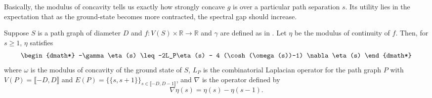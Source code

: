 Basically, the modulus of concavity tells us exactly how strongly concave $g$ is over a particular path separation $s$. Its utility lies in the expectation that as the ground-state becomes more contracted, the spectral gap should increase.

\begin{lem}\label{prop:pathop}
	Suppose $S$ is a path graph of diameter $D$ and $f:V(S)\times \mathbb{R} \longrightarrow \mathbb{R}$ and $\gamma$ are defined as in . Let $\eta$ be the modulus of continuity of $f$. Then, for $s \geq 1$, $\eta$ satisfies
	 \begin{dgroup*}
	 	\begin{dmath*}
	 	-\gamma \eta(s) \leq -2L_P\eta(s) - 4 (\cosh(\omega(s))-1) \nabla \eta(s) 
	 	\end{dmath*}
	 \end{dgroup*}
	 where $\omega$ is the modulus of concavity of the ground state of $S$, $L_P$ is the combinatorial Laplacian operator for the path graph $P$ with $V(P)=\llbracket -D,D\rrbracket$ and $E(P)=\{\{s,s+1\}\}_{s\in\llbracket -D,D-1\rrbracket}$, and $\nabla$ is the operator defined by
	 \begin{equation*}
	 	\nabla \eta(s) = \eta(s)-\eta(s-1).
	 \end{equation*}
\end{lem}

